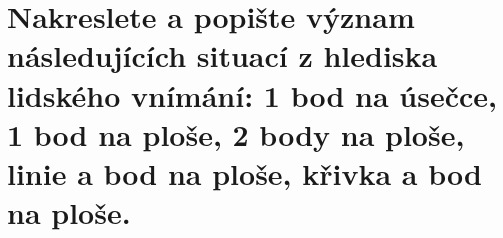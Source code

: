 \section{Nakreslete a popište význam následujících situací z hlediska lidského vnímání: 1 bod na úsečce, 1 bod na ploše, 
2 body na ploše, linie a bod na ploše, křivka a bod na ploše.}